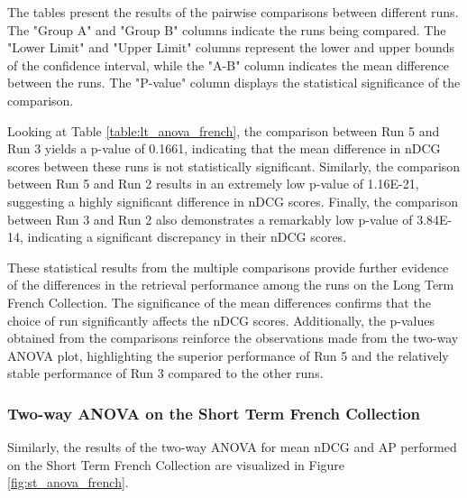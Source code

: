 The tables present the results of the pairwise comparisons between different runs. 
The "Group A" and "Group B" columns indicate the runs being compared. 
The "Lower Limit" and "Upper Limit" columns represent the lower and upper bounds of the confidence interval, while the "A-B" column indicates the mean difference between the runs. 
The "P-value" column displays the statistical significance of the comparison.

Looking at Table \ref{table:lt_anova_french}, the comparison between Run 5 and Run 3 yields a p-value of 0.1661, indicating that the mean difference in \ac{nDCG} scores between these runs is not statistically significant. 
Similarly, the comparison between Run 5 and Run 2 results in an extremely low p-value of 1.16E-21, suggesting a highly significant difference in \ac{nDCG} scores. 
Finally, the comparison between Run 3 and Run 2 also demonstrates a remarkably low p-value of 3.84E-14, indicating a significant discrepancy in their \ac{nDCG} scores.

These statistical results from the multiple comparisons provide further evidence of the differences in the retrieval performance among the runs on the Long Term French Collection. 
The significance of the mean differences confirms that the choice of run significantly affects the \ac{nDCG} scores. 
Additionally, the p-values obtained from the comparisons reinforce the observations made from the two-way \ac{ANOVA} plot, highlighting the superior performance of Run 5 and the relatively stable performance of Run 3 compared to the other runs.

\newpage
\enlargethispage{10\baselineskip}
\subsubsection{Two-way ANOVA on the Short Term French Collection}

Similarly, the results of the two-way \ac{ANOVA} for mean \ac{nDCG} and \ac{AP} performed on the Short Term French Collection are visualized in Figure \ref{fig:st_anova_french}. 

